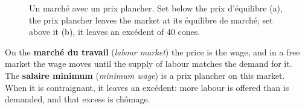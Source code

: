 \begin{figure}[h!]
  \caption*{\small Un marché avec un prix plancher. Set below the prix d'équilibre
  (a), the prix plancher leaves the market at its équilibre de marché; set above it
  (b), it
  leaves an excédent of 40 cones.}
\end{figure}

On the \textbf{marché du travail} (\textit{labour market}) the price is the wage,
and in a free market the wage moves until the supply of labour matches the demand
for it. The \textbf{salaire minimum} (\textit{minimum wage}) is a prix plancher on
this market. When it is contraignant, it leaves an excédent: more labour is offered
than is demanded, and that excess is chômage.


